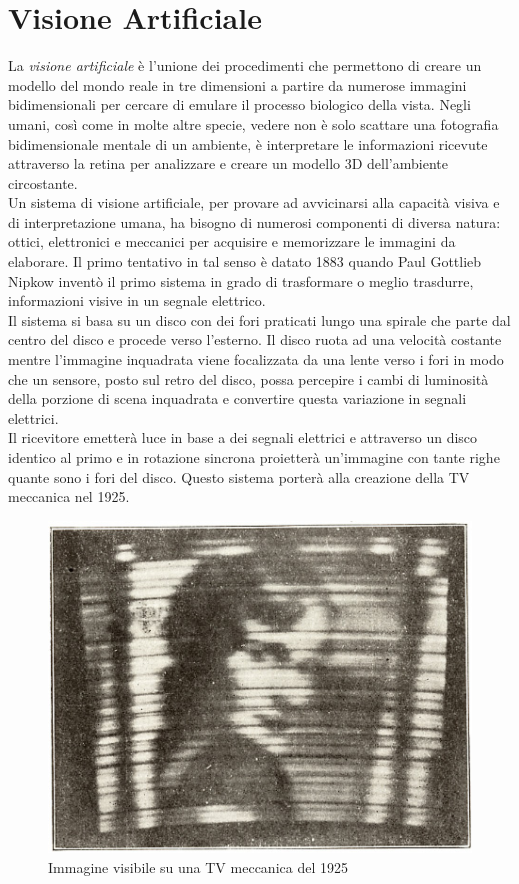 \chapter{Visione Artificiale}
\fancyfoot[C]{\thepage } 
La \textit{visione artificiale} è l'unione dei procedimenti che permettono di 
creare  un modello del mondo reale in tre dimensioni a partire da numerose 
immagini bidimensionali per cercare di emulare il processo biologico della vista.
Negli umani, così come in molte altre specie, vedere non è solo scattare una 
fotografia bidimensionale mentale di un ambiente, è interpretare le informazioni
ricevute attraverso la retina per analizzare e creare un modello 3D dell'ambiente
 circostante.\\	
Un sistema di visione artificiale, per provare ad avvicinarsi alla capacità visiva
e di interpretazione umana, ha bisogno di numerosi componenti di diversa natura: 
ottici, elettronici e meccanici per acquisire e memorizzare le immagini da elaborare.
Il primo tentativo in tal senso è datato 1883 quando  Paul Gottlieb Nipkow 
inventò il primo sistema 
in grado di trasformare o meglio trasdurre, informazioni visive in un segnale elettrico.\cite{Nipkow1} 
\\Il sistema
si basa su un disco con dei fori praticati lungo una spirale che parte dal centro del disco
e procede verso l'esterno. Il disco ruota ad una velocità costante mentre l'immagine 
inquadrata viene focalizzata da una lente verso i fori in modo che un sensore, 
posto sul retro del disco, possa percepire i cambi di luminosità della porzione di scena
inquadrata e convertire questa variazione in segnali elettrici. 
\\Il ricevitore emetterà luce in base a dei 
segnali elettrici e attraverso un disco identico al primo e in rotazione sincrona 
proietterà un'immagine con tante righe quante sono i fori del disco.\cite{Nipkow2} 
Questo sistema porterà alla creazione della TV meccanica nel 1925.
\begin{figure}[!htb] \center
\includegraphics[width=\textwidth]{immagini/tv_meccanica.png}
\caption{Immagine visibile su una TV meccanica del 1925} 
\end{figure}
